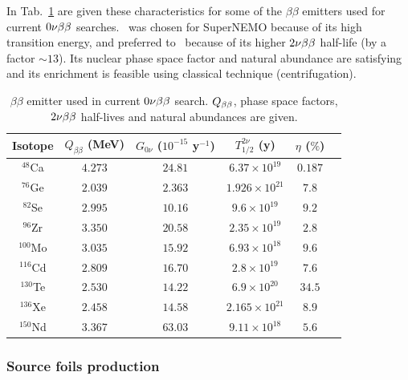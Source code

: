 In Tab.~\ref{tab:bb_isotopes} are given these characteristics for some of the $\beta\beta$ emitters used for current $0\nu\beta\beta$ searches.
\Se\ was chosen for SuperNEMO because of its high transition energy, and preferred to \Mo\ because of its higher $2\nu\beta\beta$ half-life (by a factor $\sim13$).
Its nuclear phase space factor and natural abundance are satisfying and its enrichment is feasible using classical technique (centrifugation).
\begin{table}[h!]
\centering
\begin{tabular}{|c|c|c|c|c|c|}
\hline
Isotope & $Q_{\beta\beta}$ (MeV) & $G_{0\nu}$ ($10^{-15}$ y$^{-1}$) & $T^{2\nu}_{1/2}$ (y) & $\eta$ ($\%$) \\
\hline
\hline
$^{48}$Ca & $4.273$ & $24.81$ & $6.37\times 10^{19}$ & $0.187$ \\
$^{76}$Ge & $2.039$ & $2.363$ & $1.926\times 10^{21}$ & $7.8$ \\
$^{82}$Se & $2.995$ & $10.16$ & $9.6\times 10^{19}$ & $9.2$ \\
$^{96}$Zr & $3.350$ & $20.58$ & $2.35\times 10^{19}$ & $2.8$ \\
$^{100}$Mo & $3.035$ & $15.92$ & $6.93\times 10^{18}$ & $9.6$ \\
$^{116}$Cd & $2.809$ & $16.70$ & $2.8\times 10^{19}$ & $7.6$ \\
$^{130}$Te & $2.530$ & $14.22$ & $6.9\times 10^{20}$ & $34.5$ \\
$^{136}$Xe & $2.458$ & $14.58$ & $2.165\times 10^{21}$ & $8.9$ \\
$^{150}$Nd & $3.367$ & $63.03$ & $9.11\times 10^{18}$ & $5.6$ \\
\hline
\end{tabular}
\caption{$\beta\beta$ emitter used in current $0\nu\beta\beta$ search.
$Q_{\beta\beta}$, phase space factors, $2\nu\beta\beta$ half-lives and natural abundances are given.
\label{tab:bb_isotopes}}
\end{table}

\subsubsection*{Source foils production}

